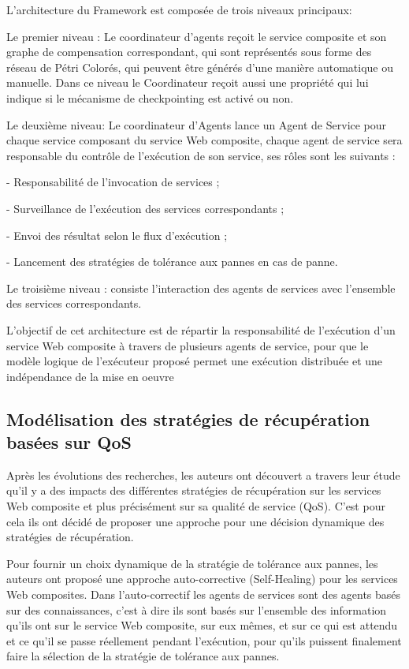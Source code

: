 L’architecture du Framework est composée de trois niveaux principaux:

Le premier niveau : Le coordinateur d’agents reçoit le service composite et son graphe de compensation correspondant, qui sont représentés sous forme des réseau de Pétri Colorés, qui peuvent être générés d'une manière automatique ou manuelle.
Dans ce niveau le Coordinateur reçoit aussi une propriété qui lui indique si le mécanisme de checkpointing est activé ou non.

Le deuxième niveau: Le coordinateur d'Agents lance un Agent de Service pour chaque service composant du service Web composite, chaque agent de service sera responsable du contrôle de l'exécution de son service, ses rôles sont les suivants \cite{1}:

    - Responsabilité de l'invocation de services ;

    - Surveillance de l'exécution des services correspondants ;
    
    - Envoi des résultat selon le flux d'exécution ;
    
    - Lancement des stratégies de tolérance aux pannes en cas de panne.

Le troisième niveau : consiste l'interaction des agents de services avec l'ensemble des services correspondants.

L'objectif de cet architecture est de répartir la responsabilité de l'exécution d'un service Web composite à travers de plusieurs agents de service, pour que le modèle logique de l'exécuteur proposé permet une exécution distribuée et une indépendance de la mise en oeuvre 

\subsection{Modélisation des stratégies de récupération basées sur QoS}

Après les évolutions des recherches, les auteurs ont découvert a travers leur étude qu'il y a des impacts des différentes stratégies de récupération sur les services Web composite et plus précisément sur sa qualité de service (QoS). C'est pour cela ils ont décidé de proposer une approche pour une décision dynamique des stratégies de récupération.

Pour fournir un choix dynamique de la stratégie de tolérance aux pannes, les auteurs ont proposé une approche auto-corrective (Self-Healing) pour les services Web composites.
Dans l'auto-correctif les agents de services sont des agents basés sur des connaissances, c'est à dire ils sont basés sur l'ensemble des information qu'ils ont sur le service Web composite, sur eux mêmes, et sur ce qui est attendu et ce qu'il se passe réellement pendant l'exécution, pour qu'ils puissent finalement faire la sélection de la stratégie de tolérance aux pannes.

